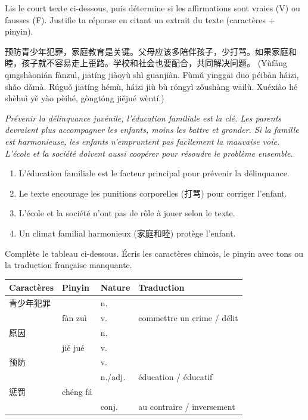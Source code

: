 \documentclass[11pt]{article}
\begin{document}
\begin{exercice}
Lis le court texte ci-dessous, puis détermine si les affirmations sont vraies (V) ou fausses (F). Justifie ta réponse en citant un extrait du texte (caractères + pinyin).
\begin{textebox}
预防青少年犯罪，家庭教育是关键。父母应该多陪伴孩子，少打骂。如果家庭和睦，孩子就不容易走上歪路。学校和社会也要配合，共同解决问题。
(Yùfáng qīngshàonián fànzuì, jiātíng jiàoyù shì guānjiàn. Fùmǔ yīnggāi duō péibàn háizi, shǎo dǎmà. Rúguǒ jiātíng hémù, háizi jiù bù róngyì zǒushàng wāilù. Xuéxiào hé shèhuì yě yào pèihé, gòngtóng jiějué wèntí.)
\par\emph{Prévenir la délinquance juvénile, l'éducation familiale est la clé. Les parents devraient plus accompagner les enfants, moins les battre et gronder. Si la famille est harmonieuse, les enfants n'empruntent pas facilement la mauvaise voie. L'école et la société doivent aussi coopérer pour résoudre le problème ensemble.}
\end{textebox}
\begin{enumerate}
    \item L'éducation familiale est le facteur principal pour prévenir la délinquance.
    \item Le texte encourage les punitions corporelles (打骂) pour corriger l'enfant.
    \item L'école et la société n'ont pas de rôle à jouer selon le texte.
    \item Un climat familial harmonieux (家庭和睦) protège l'enfant.
\end{enumerate}
\end{exercice}

\begin{exercice}
Complète le tableau ci-dessous. Écris les caractères chinois, le pinyin avec tons ou la traduction française manquante.
\begin{center}
\begin{tabularx}{\linewidth}{|X|X|X|X|}
\hline
\rowcolor{popblueL} \textbf{Caractères} & \textbf{Pinyin} & \textbf{Nature} & \textbf{Traduction} \\
\hline
青少年犯罪 &  & n. &  \\
\hline
 & fàn zuì & v. & commettre un crime / délit \\
\hline
原因 &  & n. &  \\
\hline
 & jiě jué & v. &  \\
\hline
预防 &  & v. &  \\
\hline
 &  & n./adj. & éducation / éducatif \\
\hline
惩罚 & chéng fá &  &  \\
\hline
 &  & conj. & au contraire / inversement \\
\hline
\end{tabularx}
\end{center}
\end{exercice}
\end{document}
